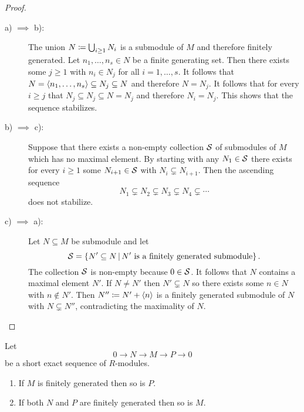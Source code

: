 \begin{proof}
  \leavevmode
  \begin{description}
    \item[a) $\implies$ b):]
      The union $N \coloneqq \bigcup_{i \geq 1} N_i$ is a submodule of $M$ and therefore finitely generated.
      Let $n_1, \dotsc, n_s \in N$ be a finite generating set.
      Then there exists some $j \geq 1$ with $n_i \in N_j$ for all $i = 1, \dotsc, s$.
      It follows that $N = \left\langle n_1, \dotsc, n_s \right\rangle \subseteq N_j \subseteq N$ and therefore $N = N_j$.
      It follows that for every $i \geq j$ that $N_j \subseteq N_j \subseteq N = N_j$ and therefore $N_i = N_j$.
      This shows that the sequence stabilizes.
    \item[b) $\implies$ c):]
      Suppose that there exists a non-empty collection $\mathcal{S}$ of submodules of $M$ which has no maximal element.
      By starting with any $N_1 \in \mathcal{S}$ there exists for every $i \geq 1$ some $N_{i+1} \in \mathcal{S}$ with $N_i \subsetneq N_{i+1}$.
      Then the ascending sequence
      \[
                    N_1
        \subsetneq  N_2
        \subsetneq  N_3
        \subsetneq  N_4
        \subsetneq  \dotsb
      \]
      does not stabilize.
    \item[c) $\implies$ a):]
      Let $N \subseteq M$ be submodule and let
      \[
          \mc{S}
        = \{
            N' \subseteq N
          \suchthat
            \text{$N'$ is a finitely generated submodule}
          \} \,.
      \]
      The collection $\mathcal{S}$ is non-empty because $0 \in \mathcal{S}$.
      It follows that $N$ contains a maximal element $N'$.
      If $N \neq N'$ then $N' \subsetneq N$ so there exists some $n \in N$ with $n \notin N'$.
      Then $N'' \coloneqq N' + \left\langle n \right\rangle$ is a finitely generated submodule of $N$ with $N \subsetneq N''$, contradicting the maximality of $N$.
    \qedhere
  \end{description}
\end{proof}


\begin{lemma}
  \label{lemma: finitely generated under ses}
  Let
  \[
        0
    \to N
    \to M
    \to P
    \to 0
  \]
  be a short exact sequence of $R$-modules.
  \begin{enumerate}
    \item
      If $M$ is finitely generated then so is $P$.
    \item
      If both $N$ and $P$ are finitely generated then so is $M$.
  \end{enumerate}
\end{lemma}


